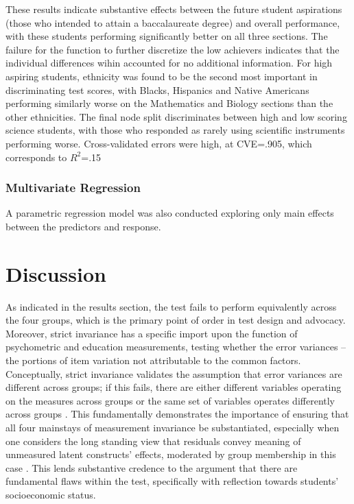 \documentclass{article}\usepackage[]{graphicx}\usepackage[]{color}
\begin{document}
These results indicate substantive effects between the future student aspirations (those who intended to attain a baccalaureate degree) and overall performance, with these students performing significantly better on all three sections. The failure for the function to further discretize the low achievers indicates that the individual differences wihin accounted for no additional information. For high aspiring students, ethnicity was found to be the second most important in discriminating test scores, with Blacks, Hispanics and Native Americans performing similarly worse on the Mathematics and Biology sections than the other ethnicities. The final node split discriminates between high and low scoring science students, with those who responded as rarely using scientific instruments performing worse. Cross-validated errors were high, at CVE=.905, which corresponds to $R^2$=.15
\subsubsection{Multivariate Regression}
A parametric regression model was also conducted exploring only main effects between the predictors and response.


\section{Discussion}
As indicated in the results section, the test fails to perform equivalently across the four groups, which is the primary point of order in test design and advocacy. Moreover, strict invariance has a specific import upon the function of psychometric and education measurements, testing whether the error variances --the portions of item variation not attributable to the common factors. Conceptually, strict invariance validates the assumption that error variances are different across groups; if this fails, there are either different variables operating on the measures across groups or the same set of variables operates differently across groups \cite{deshon}. This fundamentally demonstrates the importance of ensuring that all four mainstays of measurement invariance be substantiated, especially when one considers the long standing view that residuals convey meaning of unmeasured latent constructs' effects, moderated by group membership in this case \cite{cronbach}. This lends substantive credence to the argument that there are fundamental flaws within the test, specifically with reflection towards students' socioeconomic status.



{}

\end{document}
